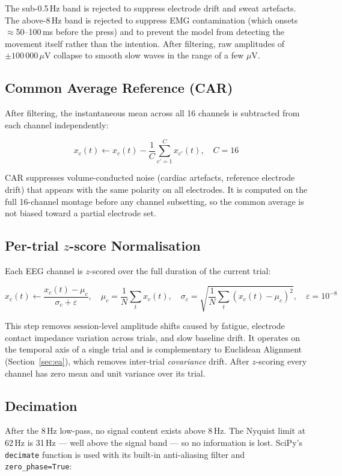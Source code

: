 \documentclass[12pt,a4paper]{article}
\begin{document}
The sub-0.5\,Hz band is rejected to suppress electrode drift and sweat
artefacts. The above-8\,Hz band is rejected to suppress EMG contamination
(which onsets $\approx$50--100\,ms before the press) and to prevent
the model from detecting the movement itself rather than the intention.
After filtering, raw amplitudes of $\pm 100\,000\,\mu$V collapse to smooth
slow waves in the range of a few $\mu$V.

\subsection{Common Average Reference (CAR)}

After filtering, the instantaneous mean across all 16 channels is subtracted
from each channel independently:

\[
  x_c(t) \leftarrow x_c(t) - \frac{1}{C} \sum_{c'=1}^{C} x_{c'}(t),
  \quad C = 16
\]

CAR suppresses volume-conducted noise (cardiac artefacts, reference
electrode drift) that appears with the same polarity on all electrodes.
It is computed on the full 16-channel montage before any channel subsetting,
so the common average is not biased toward a partial electrode set.

\subsection{Per-trial $z$-score Normalisation}

Each EEG channel is $z$-scored over the full duration of the current trial:

\[
  x_c(t) \leftarrow \frac{x_c(t) - \mu_c}{\sigma_c + \varepsilon},
  \quad \mu_c = \frac{1}{N}\sum_t x_c(t),\quad
  \sigma_c = \sqrt{\frac{1}{N}\sum_t (x_c(t)-\mu_c)^2},\quad \varepsilon = 10^{-8}
\]

This step removes session-level amplitude shifts caused by fatigue,
electrode contact impedance variation across trials, and slow baseline drift.
It operates on the temporal axis of a single trial and is complementary to
Euclidean Alignment (Section~\ref{sec:ea}), which removes inter-trial
\emph{covariance} drift. After $z$-scoring every channel has zero mean and
unit variance over its trial.

\subsection{Decimation}

After the 8\,Hz low-pass, no signal content exists above 8\,Hz. The Nyquist
limit at 62\,Hz is 31\,Hz — well above the signal band — so no information
is lost. SciPy's \texttt{decimate} function is used with its built-in
anti-aliasing filter and \texttt{zero\_phase=True}:
\end{document}
